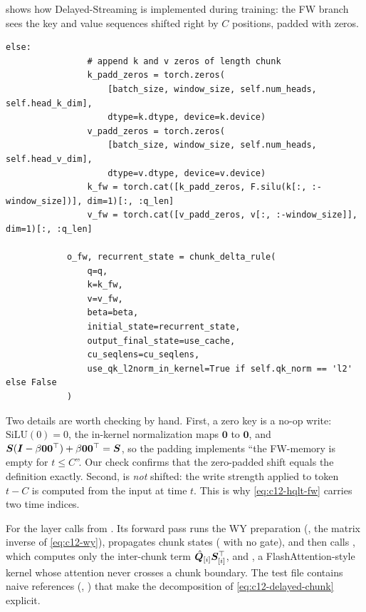  shows how Delayed-Streaming is implemented during training: the FW
branch sees the key and value sequences shifted right by $C$ positions, padded with zeros.

\begin{lstlisting}[caption={Excerpt from \texttt{repos/\allowbreak kazuki-irie\_\_hybrid-memory/\allowbreak fla/\allowbreak fla/\allowbreak layers/\allowbreak hybrid\_qlt.py} (Delayed-Streaming, no cache).},label={lst:c12-hqlt-delay}]
            else:
                # append k and v zeros of length chunk
                k_padd_zeros = torch.zeros(
                    [batch_size, window_size, self.num_heads, self.head_k_dim],
                    dtype=k.dtype, device=k.device)
                v_padd_zeros = torch.zeros(
                    [batch_size, window_size, self.num_heads, self.head_v_dim],
                    dtype=v.dtype, device=v.device)
                k_fw = torch.cat([k_padd_zeros, F.silu(k[:, :-window_size])], dim=1)[:, :q_len]
                v_fw = torch.cat([v_padd_zeros, v[:, :-window_size]], dim=1)[:, :q_len]

            o_fw, recurrent_state = chunk_delta_rule(
                q=q,
                k=k_fw,
                v=v_fw,
                beta=beta,
                initial_state=recurrent_state,
                output_final_state=use_cache,
                cu_seqlens=cu_seqlens,
                use_qk_l2norm_in_kernel=True if self.qk_norm == 'l2' else False
            )
\end{lstlisting}

Two details are worth checking by hand. First, a zero key is a no-op write: $\mathrm{SiLU}(0) =
0$, the in-kernel normalization maps $\bm0$ to $\bm0$, and $\bm{S}(\bm{I} - \beta\bm0\bm0^{\top}) +
\beta\bm0\bm0^{\top} = \bm{S}$, so the padding implements ``the FW-memory is empty for $t\le C$''. Our
check confirms that the zero-padded shift equals the definition exactly. Second,  is
\emph{not} shifted: the write strength applied to token $t-C$ is computed from the input at
time $t$. This is why \eqref{eq:c12-hqlt-fw} carries two time indices.

\begin{implnote}[title={In the code: the Delayed-Chunk kernel}]
For  the layer calls  from
. Its forward pass runs the WY preparation
(, the matrix inverse of \eqref{eq:c12-wy}), propagates chunk states
( with no gate), and then calls
, which computes only the inter-chunk term $\hat{\bm{Q}}_{[i]}\bm{S}_{[i]}^{\top}$,
and , a FlashAttention-style kernel whose attention never
crosses a chunk boundary. The test file 
contains naive references (, ) that make
the decomposition of \eqref{eq:c12-delayed-chunk} explicit.
\end{implnote}

